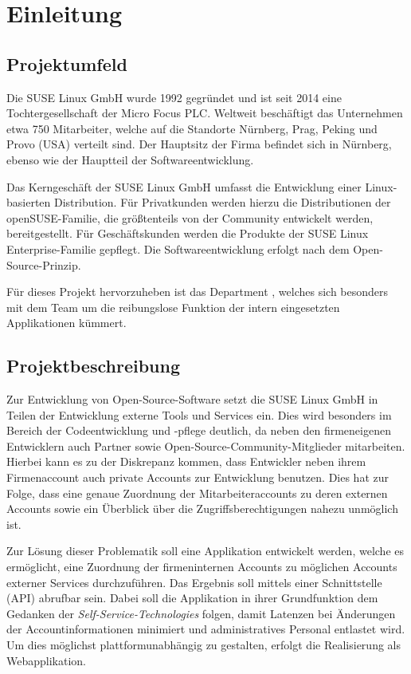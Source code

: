 \section{Einleitung}
\label{sec:Einleitung}

\subsection{Projektumfeld}
\label{sec:Projektumfeld}
Die SUSE Linux GmbH wurde 1992 gegründet und ist seit 2014 eine Tochtergesellschaft der Micro Focus
PLC. Weltweit beschäftigt das Unternehmen etwa 750 Mitarbeiter, welche auf die Standorte Nürnberg,
Prag, Peking und Provo (USA) verteilt sind. Der Hauptsitz der Firma befindet sich in Nürnberg,
ebenso wie der Hauptteil der Softwareentwicklung.

Das Kerngeschäft der SUSE Linux GmbH umfasst die Entwicklung einer Linux-basierten Distribution.
Für Privatkunden werden hierzu die Distributionen der openSUSE-Familie, die größtenteils von der
Community entwickelt werden, bereitgestellt. Für Geschäftskunden werden die Produkte der SUSE Linux
Enterprise-Familie gepflegt. Die Softwareentwicklung erfolgt nach dem Open-Source-Prinzip.

Für dieses Projekt hervorzuheben ist das Department , welches sich besonders mit dem  Team um die
reibungslose Funktion der intern eingesetzten Applikationen kümmert.

\subsection{Projektbeschreibung}
\label{sec:Projektbeschreibung}
Zur Entwicklung von Open-Source-Software setzt die SUSE Linux GmbH in Teilen der Entwicklung
externe Tools und Services ein. Dies wird besonders im Bereich der Codeentwicklung und -pflege
deutlich, da neben den firmeneigenen Entwicklern auch Partner sowie Open-Source-Community-Mitglieder
mitarbeiten. Hierbei kann es zu der Diskrepanz kommen, dass Entwickler neben ihrem Firmenaccount
auch private Accounts zur Entwicklung benutzen. Dies hat zur Folge, dass eine genaue Zuordnung
der Mitarbeiteraccounts zu deren externen Accounts
sowie ein Überblick über die Zugriffsberechtigungen nahezu unmöglich ist.

Zur Lösung dieser Problematik soll eine Applikation entwickelt werden, welche es ermöglicht,
eine Zuordnung der firmeninternen Accounts zu möglichen Accounts externer Services durchzuführen.
Das Ergebnis soll mittels einer Schnittstelle (\acs{API}) abrufbar sein.
Dabei soll die Applikation in ihrer Grundfunktion dem Gedanken der \textit{Self-Service-Technologies} folgen,
damit Latenzen bei Änderungen der Accountinformationen minimiert und administratives Personal
entlastet wird. Um dies möglichst plattformunabhängig zu gestalten, erfolgt die Realisierung als
Webapplikation.

